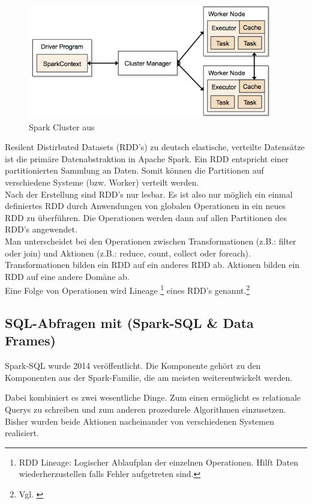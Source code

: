 \begin{figure}[h]
  \centering
  \includegraphics[width=\textwidth,height=50mm]{./bilder/cluster-overview.png}
  \caption{Spark Cluster aus \cite{SPCLUSTER}}\label{fig:spark_cluster}
\end{figure}



\noindent
Resilent Distirbuted Datasets (RDD's) zu deutsch elastische, verteilte Datensätze ist die primäre Datenabstraktion in Apache Spark. 
Ein RDD entspricht einer partitionierten Sammlung an Daten. Somit können die Partitionen auf verschiedene Systeme (bzw. Worker) verteilt werden.  \\
Nach der Erstellung sind RDD's nur lesbar. Es ist also nur möglich ein einmal definiertes RDD durch Anwendungen von globalen Operationen in ein neues RDD zu überführen. Die Operationen werden dann auf allen Partitionen des RDD's angewendet. \\
\noindent
Man unterscheidet bei den Operationen zwischen Transformationen (z.B.: filter oder join) und Aktionen (z.B.: reduce, count, collect oder foreach). Transformationen bilden ein RDD auf ein anderes RDD ab. Aktionen bilden ein RDD auf eine andere Domäne ab.\\ %
\noindent
Eine Folge von Operationen wird Lineage \footnote{RDD Lineage: Logischer Ablaufplan der einzelnen Operationen. Hilft Daten wiederherzustellen falls Fehler aufgetreten sind.} eines RDD's genannt.\footnote{Vgl. \cite{ZC+12}}



\newpage
\subsection{SQL-Abfragen mit (Spark-SQL \& Data Frames)}

Spark-SQL wurde 2014 veröffentlicht. Die Komponente gehört zu den Komponenten aus der Spark-Familie, die am meisten weiterentwickelt werden. 


Dabei kombiniert es zwei wesentliche Dinge. Zum einen ermöglicht es relationale Querys zu schreiben und zum anderen prozedurele Algorithmen einzusetzen. Bisher wurden beide Aktionen nacheinander von verschiedenen Systemen realisiert. 

